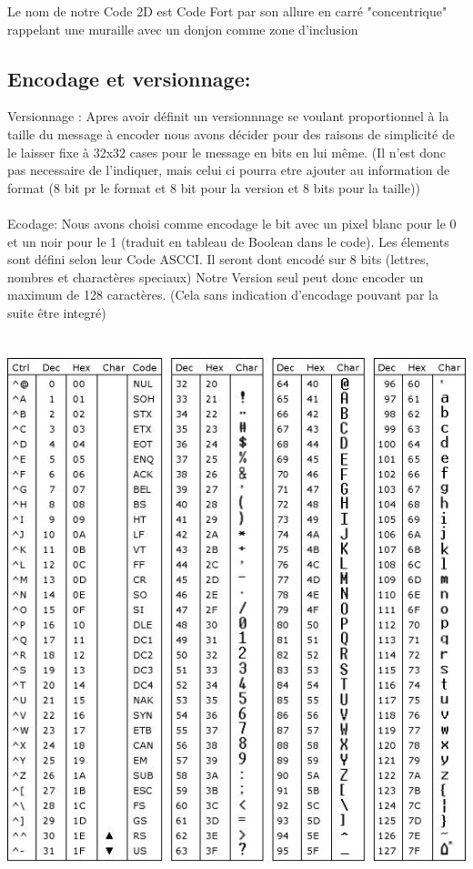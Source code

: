 \documentclass{article}
\begin{document}
Le nom de notre Code 2D est Code Fort par son allure en carré "concentrique" rappelant une muraille avec un donjon comme zone d'inclusion  
\subsection{Encodage et versionnage:}
Versionnage :
Apres avoir définit un versionnnage se voulant proportionnel à la taille du message à encoder nous avons décider pour des raisons de simplicité de le laisser fixe à 32x32 cases pour le message en bits en lui même. (Il n'est donc pas necessaire de l'indiquer, mais celui ci pourra etre ajouter au information de format (8 bit pr le format et 8 bit pour la version et 8 bits pour la taille)) \\
\\
Ecodage:
Nous avons choisi comme encodage le bit avec un pixel blanc pour le 0 et un noir pour le 1 (traduit en tableau de Boolean dans le code). Les élements sont défini selon leur Code ASCCI. Il seront dont encodé sur 8 bits (lettres, nombres et charactères speciaux)
Notre Version seul peut donc encoder un maximum de 128 caractères. (Cela sans indication d'encodage pouvant par la suite être integré) 
\\\\\\
\includegraphics[scale=0.6]{code_ascii_1.jpg} 
\\
\end{document}
